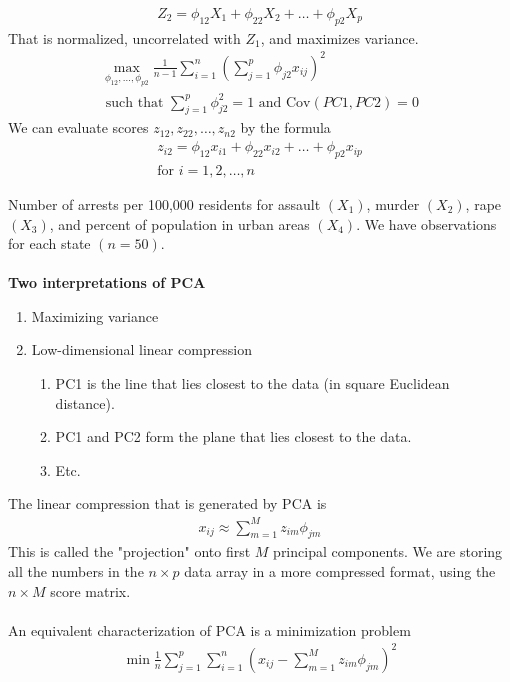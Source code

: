 \documentclass[12pt, letterpaper]{article}
\begin{document}
\begin{enumerate}
\begin{align*}
        Z_2 = \phi_{12}X_1 + \phi_{22}X_2 + \dots + \phi_{p2}X_p
    \end{align*}
    That is normalized, uncorrelated with $Z_1$, and maximizes variance.
    \begin{align*}
        \max_{\phi_{12},\dots, \phi_{p2}} \frac{1}{n-1}\sum_{i=1}^{n}\left(\sum_{j=1}^{p} \phi_{j2}x_{ij} \right)^2 \\
        \text{ such that } \sum_{j=1}^{p}\phi_{j2}^2 = 1 \text{ and Cov}(PC1,PC2)=0
    \end{align*}
    We can evaluate scores $z_{12}, z_{22},\dots, z_{n2}$ by the formula
    \begin{align*}
        z_{i2} = \phi_{12}x_{i1} + \phi_{22}x_{i2} + \dots + \phi_{p2}x_{ip} \\ 
        \text{for } i = 1, 2, \dots, n
    \end{align*}
\end{enumerate}
 Number of arrests per 100,000 residents for assault $(X_1)$, murder $(X_2)$, 
rape $(X_3)$, and percent of population in urban areas $(X_4)$. We have observations for each
state $(n=50)$. \\ \\
\textbf{Two interpretations of PCA}
\begin{enumerate}
    \item Maximizing variance
    \item Low-dimensional linear compression
    \begin{enumerate}
        \item PC1 is the line that lies closest to the data (in square Euclidean distance).
        \item PC1 and PC2 form the plane that lies closest to the data.
        \item Etc.
    \end{enumerate}
\end{enumerate}
The linear compression that is generated by PCA is 
\begin{align*}
    x_{ij} \approx \sum_{m=1}^{M} z_{im}\phi_{jm}
\end{align*}
This is called the "projection" onto first $M$ principal components. We are storing 
all the numbers in the $n\times p$ data array in a more compressed format, using 
the $n\times M$ score matrix. \\ \\
An equivalent characterization of PCA is a minimization problem
\begin{align*}
    \min \frac 1n \sum_{j=1}^{p}\sum_{i=1}^{n}\left(x_{ij} - \sum_{m=1}^{M}z_{im}\phi_{jm}\right)^2
\end{align*}
\end{document}
